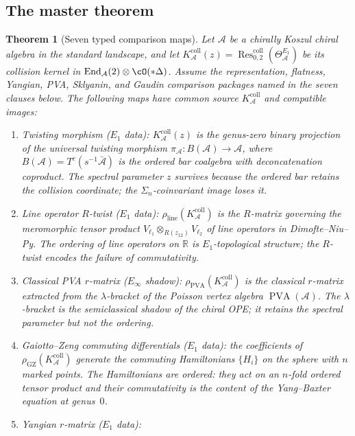 \documentclass[11pt]{article}
\theoremstyle{plain}
\newtheorem{theorem}{Theorem}[section]
\theoremstyle{definition}
\theoremstyle{remark}
\newcommand{\cA}{\mathcal{A}}
\newcommand{\Res}{\operatorname{Res}}
\begin{document}
\subsection{The master theorem}

\begin{theorem}[Seven typed comparison maps]\label{thm:seven-faces}
Let $\cA$ be a chirally Koszul chiral algebra in the standard
landscape, and let
$K_\cA^{\mathrm{coll}}(z)
=\Res^{\mathrm{coll}}_{0,2}(\Theta_{\cA}^{E_1})$ be its collision
kernel in $\operatorname{End}_\cA(2)\otimes\cO(*\Delta)$.  Assume
the representation, flatness, Yangian, PVA, Sklyanin, and Gaudin
comparison packages named in the seven clauses below.  The following
maps have common source $K_\cA^{\mathrm{coll}}$ and compatible images:
\begin{enumerate}[label=\textup{\textbf{(F\arabic*)}}]
 \item \emph{Twisting morphism}\/ ($E_1$ data):
 $K_\cA^{\mathrm{coll}}(z)$ is the
 genus-zero binary projection of the universal twisting morphism
 $\pi_{\cA}\colon B(\cA)\to\cA$, where
 $B(\cA) = T^c(s^{-1}\bar{\cA})$ is the ordered bar coalgebra
 with deconcatenation coproduct. The spectral parameter $z$
 survives because the ordered bar retains the collision
 coordinate; the $\Sigma_n$-coinvariant image loses it.
 \item \emph{Line operator $R$-twist}\/ ($E_1$ data):
 $\rho_{\mathrm{line}}(K_\cA^{\mathrm{coll}})$ is
 the $R$-matrix governing the meromorphic tensor product
 $V_{\ell_1}\otimes_{R(z_{12})}V_{\ell_2}$ of line operators
 in Dimofte--Niu--Py. The ordering of line operators on $\mathbb{R}$
 is $E_1$-topological structure; the $R$-twist encodes the
 failure of commutativity.
 \item \emph{Classical PVA $r$-matrix}\/ ($E_\infty$ shadow):
 $\rho_{\mathrm{PVA}}(K_\cA^{\mathrm{coll}})$
 is the classical $r$-matrix extracted from the $\lambda$-bracket
 of the Poisson vertex algebra $\operatorname{PVA}(\cA)$. The
 $\lambda$-bracket is the semiclassical shadow of the chiral OPE;
 it retains the spectral parameter but not the ordering.
 \item \emph{Gaiotto--Zeng commuting differentials}\/ ($E_1$ data):
 the coefficients of $\rho_{\mathrm{GZ}}(K_\cA^{\mathrm{coll}})$ generate the
 commuting Hamiltonians $\{H_i\}$ on the sphere with $n$ marked
 points. The Hamiltonians are ordered: they act on an
 $n$-fold ordered tensor product and their commutativity is the
 content of the Yang--Baxter equation at genus~$0$.
 \item \emph{Yangian $r$-matrix}\/ ($E_1$ data):

\end{enumerate}
\end{theorem}
\end{document}
